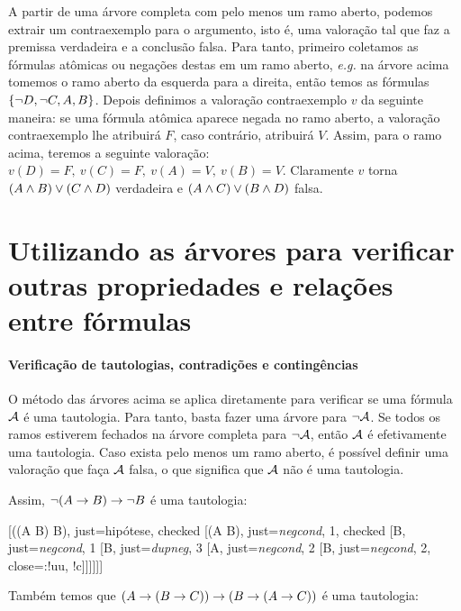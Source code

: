A partir de uma árvore completa com pelo menos um ramo aberto, podemos extrair um contraexemplo para o argumento, isto é, uma valoração tal que faz a premissa verdadeira e a conclusão falsa. Para tanto, primeiro coletamos as fórmulas atômicas ou negações destas em um ramo aberto, \emph{e.g.} na árvore acima tomemos o ramo aberto da esquerda para a direita, então temos as fórmulas $\{\neg D, \neg C, A, B\}$.
Depois definimos a valoração contraexemplo $v$ da seguinte maneira: se uma fórmula atômica aparece negada no ramo aberto, a valoração contraexemplo lhe atribuirá $F$, caso contrário, atribuirá $V$.
Assim, para o ramo acima, teremos a seguinte valoração: $v(D)=F,\: v(C)=F,\: v(A)=V,\: v(B)=V$.
Claramente $v$ torna $(A \wedge B) \vee (C \wedge D)$ verdadeira e $(A \wedge C) \vee (B \wedge D)$ falsa.

\section{Utilizando as árvores para verificar outras propriedades e relações entre fórmulas}

\paragraph{Verificação de tautologias, contradições e contingências}

O método das árvores acima se aplica diretamente para verificar se uma fórmula $\mathcal{A}$ é uma tautologia.
Para tanto, basta fazer uma árvore para $\neg\mathcal{A}$.
Se todos os ramos estiverem fechados na árvore completa para $\neg\mathcal{A}$, então $\mathcal{A}$ é efetivamente uma tautologia.
Caso exista pelo menos um ramo aberto, é possível definir uma valoração que faça $\mathcal{A}$ falsa, o que significa que $\mathcal{A}$ não é uma tautologia.

Assim, $\neg(A \rightarrow B) \rightarrow \neg B$ é uma tautologia:

\begin{center}
\begin{tableau}
	{
	}
	[\enot(\enot(A \eif B) \eif \enot B), just={hipótese}, checked
		[\enot(A \eif B), just={\emph{negcond}, 1}, checked
		[\enot \enot B, just={\emph{negcond}, 1}
		[B, just={\emph{dupneg}, 3}
		[A, just={\emph{negcond}, 2}
		[\enot B, just={\emph{negcond}, 2}, close={:!uu, !c}]]]]]]
\end{tableau}
\end{center}

Também temos que $(A \rightarrow (B \rightarrow C)) \rightarrow (B \rightarrow (A \rightarrow C))$ é uma tautologia:

